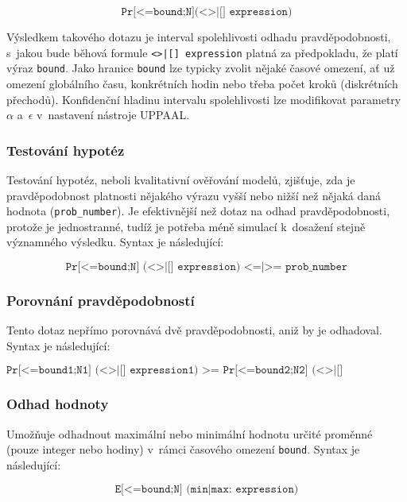 \begin{equation*}
    \texttt{Pr[<=bound;N](<>|[] expression)}
\end{equation*}

Výsledkem takového dotazu je interval spolehlivosti odhadu pravděpodobnosti, s~jakou bude běhová formule \texttt{<>|[] expression} platná za předpokladu, že platí výraz \texttt{bound}. Jako hranice \texttt{bound} lze typicky zvolit nějaké časové omezení, ať už omezení globálního času, konkrétních hodin nebo třeba počet kroků (diskrétních přechodů). Konfidenční hladinu intervalu spolehlivosti lze modifikovat parametry $\alpha$ a~$\epsilon$ v~nastavení nástroje UPPAAL.

\subsubsection{Testování hypotéz}
Testování hypotéz, neboli kvalitativní ověřování modelů, zjišťuje, zda je pravděpodobnost platnosti nějakého výrazu vyšší nebo nižší než nějaká daná hodnota (\texttt{prob\_number}). Je efektivnější než dotaz na odhad pravděpodobnosti, protože je jednostranné, tudíž je potřeba méně simulací k~dosažení stejně významného výsledku. Syntax je následující:

\begin{equation*}
    \texttt{Pr[<=bound;N] (<>|[] expression) <=|>= prob\_number}
\end{equation*}

\subsubsection{Porovnání pravděpodobností}
Tento dotaz nepřímo porovnává dvě pravděpodobnosti, aniž by je odhadoval. Syntax je následující:

\begin{equation*}
    \texttt{Pr[<=bound1;N1] (<>|[] expression1) >= Pr[<=bound2;N2] (<>|[] expression2)}
\end{equation*}

\subsubsection{Odhad hodnoty}
Umožňuje odhadnout maximální nebo minimální hodnotu určité proměnné (pouze integer nebo hodiny) v~rámci časového omezení \texttt{bound}. Syntax je následující:

\begin{equation*}
    \texttt{E[<=bound;N] (min|max: expression)}
\end{equation*}

